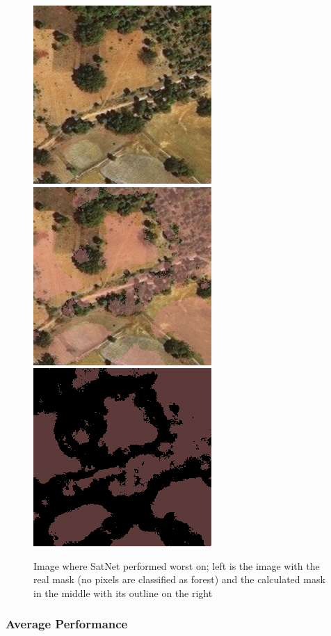 \begin{figure}
\begin{center}
  \label{satnet_worst2}
  \includegraphics[width=.3\linewidth]{images/satellite_images/sat_worst2_1}
  \includegraphics[width=.3\linewidth]{images/satellite_images/sat_worst2_2}
  \includegraphics[width=.3\linewidth]{images/satellite_images/sat_worst2_3}
  \caption{Image where SatNet performed worst on; left is the image with the real mask (no pixels are classified as forest) and the calculated mask in the middle with its outline on the right}
  \end{center}
\end{figure}

\subsubsection{Average Performance}
